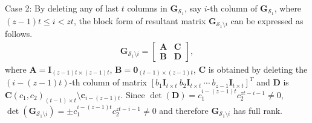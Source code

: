 \documentclass[journal,twocolumn]{IEEEtran}
\theoremstyle{definition}
\newcommand{\calS}{\mathcal{S}}
\newcommand{\bfc}{\mathbf{c}}
\newcommand{\bfG}{\mathbf{G}}
\newcommand{\bfI}{\mathbf{I}}
\newcommand{\bfC}{\mathbf{C}}
\newcommand{\bfD}{\mathbf{D}}
\newcommand{\bfA}{\mathbf{A}}
\newcommand{\bfzr}{\mathbf{0}}
\begin{document}
\begin{itemize}
	Case 2: By deleting any of last $t$ columns in $\bfG_{\calS_1}$, say $i$-th column of $\bfG_{\calS_1}$, where $(z-1)t\le i<zt$, the block form of resultant matrix $\bfG_{\calS_1 \setminus i}$ can be expressed as follows.
	\begin{align*}
		\bfG_{\calS_1 \setminus i}=
		\left[
		\begin{array}{c|c}
			\mathbf A&\mathbf C\\  \hline
			\mathbf B&\mathbf D
		\end{array}
		\right],
	\end{align*}
	where $\bfA = \bfI_{(z-1)t\times (z-1)t}$, $\mathbf B=\bfzr_{(t-1)\times (z-1)t}$, $\bfC$ is obtained by deleting the $(i-(z-1)t)$-th column of matrix $[{b_1}\bfI_{t\times t}~{b_2}\bfI_{t\times t}~\cdots~{b_{z-1}}\bfI_{t\times t}]^T$ and $\bfD$ is $\bfC(c_1, c_2)_{(t-1)\times t}\setminus \bfc_{i-(z-1)t}$. Since $\det(\bfD)=c_1^{i-(z-1)t}c_2^{zt-i-1}\neq 0$,  $\det(\bfG_{\calS_1 \setminus i})= \pm c_1^{i-(z-1)t}c_2^{zt-i-1}\neq 0$ and therefore $\bfG_{\calS_1 \setminus i}$ has full rank. %
	

\end{itemize}
\end{document}
